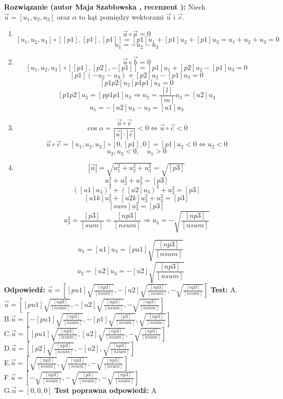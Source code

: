 \documentclass[12pt, a4paper]{article}
\theoremstyle{definition} %
\newcommand{\rozwStart}[2]{\noindent \textbf{Rozwiązanie (autor #1 , recenzent #2): }\newline} %
\newcommand{\rozwStop}{\newline}                                            %
\newcommand{\odpStart}{\noindent \textbf{Odpowiedź:}\newline}    %
\newcommand{\odpStop}{\newline}                                             %
\newcommand{\testStart}{\noindent \textbf{Test:}\newline} %
\newcommand{\testStop}{\newline} %
\newcommand{\kluczStart}{\noindent \textbf{Test poprawna odpowiedź:}\newline} %
\newcommand{\kluczStop}{\newline} %
\begin{document}
\rozwStart{Maja Szabłowska}{}
Niech $\vec{u}=[u_{1}, u_{2}, u_{3}]$ oraz $\alpha$ to kąt pomiędzy wektorami $\vec{u}$ i $\vec{c}.$
\begin{enumerate}

    \item $$\vec{u}\circ\vec{a}=0$$
$$[u_{1}, u_{2}, u_{3}]\circ[[p1],[p1],[p1]]=[p1]u_{1}+[p1]u_{2}+[p1]u_{3}=u_{1}+u_{2}+u_{3}=0$$
$$u_{1}=-u_{2}-u_{3}$$

    \item $$\vec{u}\circ\vec{b}=0$$
$$[u_{1}, u_{2}, u_{3}]\circ[[p1],[p2],-[p1]]=[p1]u_{1}+[p2]u_{2}-[p1]u_{3}=0$$
$$[p1](-u_{2}-u_{3})+[p2]u_{2}-[p1]u_{3}=0$$
$$[p1p2]u_{2}[p1p1]u_{3}=0$$
$$[p1p2]u_{2}=[pp1p1]u_{3} \Rightarrow u_{2}=\frac{[l]}{[m]}u_{3}=[u2]u_{3}$$
$$u_{1}=-[u2]u_{3}-u_{3}=[u1]u_{3}$$

    \item $$\cos\alpha=\frac{\vec{u}\circ\vec{c}}{|\vec{u}|\cdot|\vec{c}|}<0 \iff \vec{u}\circ\vec{c}<0$$
$$\vec{u}\circ\vec{c}=[u_{1}, u_{2}, u_{3}]\circ[0,[p1],0]=[p1]u_{2}<0 \iff u_{2}<0$$
$$u_{2}, u_{3}<0, \quad u_{1}>0$$

    \item $$|\vec{u}|=\sqrt{u_{1}^{2}+u_{2}^{2}+u_{3}^{2}}=\sqrt{[p3]}$$
    $$u_{1}^{2}+u_{2}^{2}+u_{3}^{2}=[p3]$$
    $$([u1]u_{3})^{2}+([u2]u_{3})^{2}+u_{3}^{2}=[p3]$$
    $$[u1k]u_{3}^{2}+[u2k]u_{3}^{2}+u_{3}^{2}=[p3]$$
    $$[sum]u_{3}^{2}=[p3]$$
    $$u_{3}^{2}=\frac{[p3]}{[sum]}=\frac{[np3]}{[nsum]} \Rightarrow u_{3}=-\sqrt{\frac{[np3]}{[nsum]}}$$
\end{enumerate}
$$u_{1}=[u1]u_{3}=[pu1]\sqrt{\frac{[np3]}{[nsum]}}$$
$$u_{2}=[u2]u_{3}=-[u2]\sqrt{\frac{[np3]}{[nsum]}}$$
\rozwStop
\odpStart
$\vec{u}=\left[[pu1]\sqrt{\frac{[np3]}{[nsum]}},-[u2]\sqrt{\frac{[np3]}{[nsum]}},-\sqrt{\frac{[np3]}{[nsum]}}\right]$
\odpStop
\testStart
A.$\vec{u}=\left[[pu1]\sqrt{\frac{[np3]}{[nsum]}},-[u2]\sqrt{\frac{[np3]}{[nsum]}},-\sqrt{\frac{[np3]}{[nsum]}}\right]$\\
B.$\vec{u}=\left[-[pu1]\sqrt{\frac{[np3]}{[nsum]}},-[p1]\sqrt{\frac{[p3]}{[nsum]}},\sqrt{\frac{[np3]}{[nsum]}}\right]$\\
C.$\vec{u}=\left[[pu1]\sqrt{\frac{[np3]}{[nsum]}},[u2]\sqrt{\frac{[np3]}{[nsum]}},-\sqrt{\frac{[np3]}{[nsum]}}\right]$\\
D.$\vec{u}=\left[[p2]\sqrt{\frac{[np3]}{[nsum]}},-[u2],\sqrt{\frac{[np3]}{[nsum]}}\right]$\\
E.$\vec{u}=\left[\sqrt{\frac{[np3]}{[nsum]}},\sqrt{\frac{[np3]}{[nsum]}},-\sqrt{\frac{[np3]}{[nsum]}}\right]$\\
F.$\vec{u}=\left[-\sqrt{\frac{[np3]}{[nsum]}},-\sqrt{\frac{[p3]}{[nsum]}},-\sqrt{\frac{[np3]}{[nsum]}}\right]$\\
G.$\vec{u}=[0,0,0]$
\testStop
\kluczStart
A
\kluczStop
\end{document}
